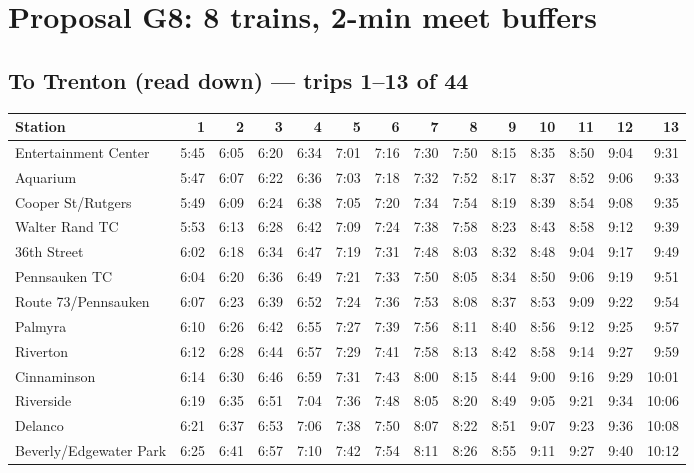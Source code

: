 \section{Proposal G8: 8 trains, 2-min meet buffers}\label{tt:proposal_G8}
\subsection*{To Trenton (read down) --- trips 1--13 of 44}
\begin{center}\footnotesize\setlength{\tabcolsep}{3pt}\begin{tabular}{@{}lrrrrrrrrrrrrr@{}}\toprule
Station & 1 & 2 & 3 & 4 & 5 & 6 & 7 & 8 & 9 & 10 & 11 & 12 & 13 \\\midrule
Entertainment Center & 5:45 & 6:05 & 6:20 & 6:34 & 7:01 & 7:16 & 7:30 & 7:50 & 8:15 & 8:35 & 8:50 & 9:04 & 9:31 \\
Aquarium & 5:47 & 6:07 & 6:22 & 6:36 & 7:03 & 7:18 & 7:32 & 7:52 & 8:17 & 8:37 & 8:52 & 9:06 & 9:33 \\
Cooper St/Rutgers & 5:49 & 6:09 & 6:24 & 6:38 & 7:05 & 7:20 & 7:34 & 7:54 & 8:19 & 8:39 & 8:54 & 9:08 & 9:35 \\
Walter Rand TC & 5:53 & 6:13 & 6:28 & 6:42 & 7:09 & 7:24 & 7:38 & 7:58 & 8:23 & 8:43 & 8:58 & 9:12 & 9:39 \\
36th Street & 6:02 & 6:18 & 6:34 & 6:47 & 7:19 & 7:31 & 7:48 & 8:03 & 8:32 & 8:48 & 9:04 & 9:17 & 9:49 \\
Pennsauken TC & 6:04 & 6:20 & 6:36 & 6:49 & 7:21 & 7:33 & 7:50 & 8:05 & 8:34 & 8:50 & 9:06 & 9:19 & 9:51 \\
Route 73/Pennsauken & 6:07 & 6:23 & 6:39 & 6:52 & 7:24 & 7:36 & 7:53 & 8:08 & 8:37 & 8:53 & 9:09 & 9:22 & 9:54 \\
Palmyra & 6:10 & 6:26 & 6:42 & 6:55 & 7:27 & 7:39 & 7:56 & 8:11 & 8:40 & 8:56 & 9:12 & 9:25 & 9:57 \\
Riverton & 6:12 & 6:28 & 6:44 & 6:57 & 7:29 & 7:41 & 7:58 & 8:13 & 8:42 & 8:58 & 9:14 & 9:27 & 9:59 \\
Cinnaminson & 6:14 & 6:30 & 6:46 & 6:59 & 7:31 & 7:43 & 8:00 & 8:15 & 8:44 & 9:00 & 9:16 & 9:29 & 10:01 \\
Riverside & 6:19 & 6:35 & 6:51 & 7:04 & 7:36 & 7:48 & 8:05 & 8:20 & 8:49 & 9:05 & 9:21 & 9:34 & 10:06 \\
Delanco & 6:21 & 6:37 & 6:53 & 7:06 & 7:38 & 7:50 & 8:07 & 8:22 & 8:51 & 9:07 & 9:23 & 9:36 & 10:08 \\
Beverly/Edgewater Park & 6:25 & 6:41 & 6:57 & 7:10 & 7:42 & 7:54 & 8:11 & 8:26 & 8:55 & 9:11 & 9:27 & 9:40 & 10:12 \\

\end{tabular}
\end{center}
